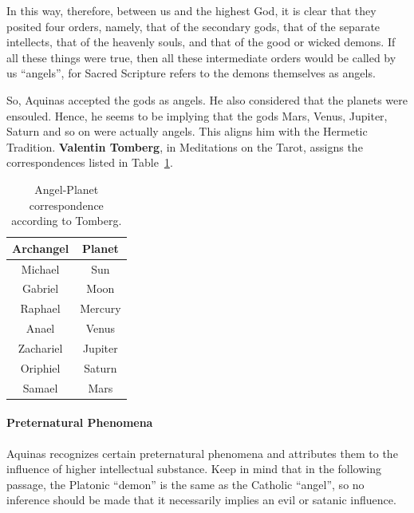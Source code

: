 \begin{quotex}
In this way, therefore, between us and the highest God, it is clear that they posited four orders, namely, that of the secondary gods, that of the separate intellects, that of the heavenly souls, and that of the good or wicked demons. If all these things were true, then all these intermediate orders would be called by us “angels”, for Sacred Scripture refers to the demons themselves as angels. 

\end{quotex}
So, Aquinas accepted the gods as angels. He also considered that the planets were ensouled. Hence, he seems to be implying that the gods Mars, Venus, Jupiter, Saturn and so on were actually angels. This aligns him with the Hermetic Tradition. \textbf{Valentin Tomberg}, in Meditations on the Tarot, assigns the correspondences listed in Table~\ref{tab:AngDem2011}.

\begin{table}[h]
\begin{center}
\begin{tabular}{*2c}\toprule
Archangel &
Planet\\\midrule
Michael &
Sun\\
Gabriel &
Moon\\
Raphael &
Mercury\\
Anael &
Venus\\
Zachariel &
Jupiter\\
Oriphiel &
Saturn\\
Samael &
Mars\\\bottomrule
\end{tabular}
\end{center}
\caption{Angel-Planet correspondence according to Tomberg.}\label{tab:AngDem2011}
\end{table}

\paragraph{Preternatural Phenomena}
Aquinas recognizes certain preternatural phenomena and attributes them to the influence of higher intellectual substance. Keep in mind that in the following passage, the Platonic “demon” is the same as the Catholic “angel”, so no inference should be made that it necessarily implies an evil or satanic influence.

